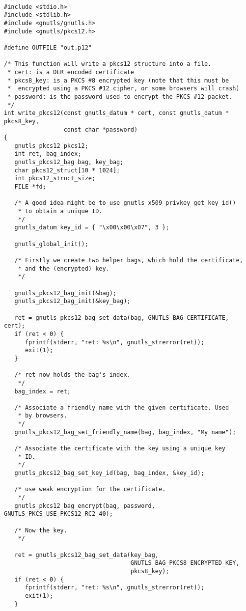 \begin{verbatim}

#include <stdio.h>
#include <stdlib.h>
#include <gnutls/gnutls.h>
#include <gnutls/pkcs12.h>

#define OUTFILE "out.p12"

/* This function will write a pkcs12 structure into a file.
 * cert: is a DER encoded certificate
 * pkcs8_key: is a PKCS #8 encrypted key (note that this must be
 *  encrypted using a PKCS #12 cipher, or some browsers will crash)
 * password: is the password used to encrypt the PKCS #12 packet.
 */
int write_pkcs12(const gnutls_datum * cert, const gnutls_datum * pkcs8_key,
                 const char *password)
{
   gnutls_pkcs12 pkcs12;
   int ret, bag_index;
   gnutls_pkcs12_bag bag, key_bag;
   char pkcs12_struct[10 * 1024];
   int pkcs12_struct_size;
   FILE *fd;

   /* A good idea might be to use gnutls_x509_privkey_get_key_id()
    * to obtain a unique ID.
    */
   gnutls_datum key_id = { "\x00\x00\x07", 3 };

   gnutls_global_init();

   /* Firstly we create two helper bags, which hold the certificate,
    * and the (encrypted) key.
    */

   gnutls_pkcs12_bag_init(&bag);
   gnutls_pkcs12_bag_init(&key_bag);

   ret = gnutls_pkcs12_bag_set_data(bag, GNUTLS_BAG_CERTIFICATE, cert);
   if (ret < 0) {
      fprintf(stderr, "ret: %s\n", gnutls_strerror(ret));
      exit(1);
   }

   /* ret now holds the bag's index.
    */
   bag_index = ret;

   /* Associate a friendly name with the given certificate. Used
    * by browsers.
    */
   gnutls_pkcs12_bag_set_friendly_name(bag, bag_index, "My name");

   /* Associate the certificate with the key using a unique key
    * ID.
    */
   gnutls_pkcs12_bag_set_key_id(bag, bag_index, &key_id);

   /* use weak encryption for the certificate. 
    */
   gnutls_pkcs12_bag_encrypt(bag, password, GNUTLS_PKCS_USE_PKCS12_RC2_40);

   /* Now the key.
    */

   ret = gnutls_pkcs12_bag_set_data(key_bag,
                                    GNUTLS_BAG_PKCS8_ENCRYPTED_KEY,
                                    pkcs8_key);
   if (ret < 0) {
      fprintf(stderr, "ret: %s\n", gnutls_strerror(ret));
      exit(1);
   }


\end{verbatim}
